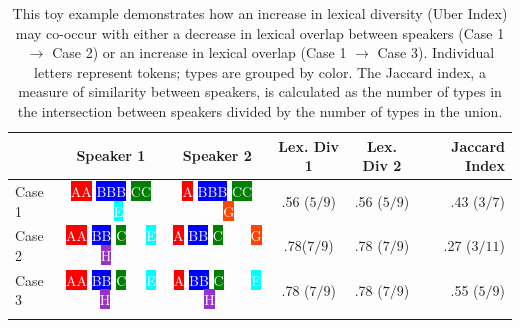 \documentclass[10pt,letterpaper]{article}
\begin{document}
\begin{table}[b]
\centering
\begin{tabular}{ l | c | c | c | c | r }
    & Speaker 1  & Speaker 2 & Lex. Div 1 & Lex. Div 2 & Jaccard Index\\
    \hline
  Case 1 & \colorbox{red}{\textcolor{white}{AA}} \colorbox{blue}{\textcolor{white}{BBB}} \colorbox{green}{\textcolor{white}{CC}} \colorbox{BurntOrange}{\textcolor{white}{D}} \colorbox{cyan}{\textcolor{white}{E}} & \colorbox{red}{\textcolor{white}{A}}  \colorbox{blue}{\textcolor{white}{BBB}} \colorbox{green}{\textcolor{white}{CC}} \colorbox{OliveGreen}{\textcolor{white}{FF}} \colorbox{OrangeRed}{\textcolor{white}{G}} & .56 ($5/9$) & .56 ($5/9$) & .43 ($3/7$)  \\
  Case 2 & \colorbox{red}{\textcolor{white}{AA}} \colorbox{blue}{\textcolor{white}{BB}} \colorbox{green}{\textcolor{white}{C}} \colorbox{BurntOrange}{\textcolor{white}{D}} \colorbox{cyan}{\textcolor{white}{E}} \colorbox{DarkOrchid} {\textcolor{white}{H}} \colorbox{Emerald}{\textcolor{white}{I}} & \colorbox{red}{\textcolor{white}{A}}  \colorbox{blue}{\textcolor{white}{BB}} \colorbox{green}{\textcolor{white}{C}} \colorbox{OliveGreen}{\textcolor{white}{FF}} \colorbox{OrangeRed}{\textcolor{white}{G}} \colorbox{RoyalPurple}{\textcolor{white}{J}} \colorbox{Dandelion}{\textcolor{white}{K}}  & .78($7/9$) & .78 ($7/9$) & .27 ($3/11$)  \\
  Case 3 & \colorbox{red}{\textcolor{white}{AA}} \colorbox{blue}{\textcolor{white}{BB}}  \colorbox{green}{\textcolor{white}{C}}  \colorbox{BurntOrange}{\textcolor{white}{D}} \colorbox{cyan}{\textcolor{white}{E}} \colorbox{DarkOrchid} {\textcolor{white}{H}} \colorbox{RoyalPurple}{\textcolor{white}{J}} &  \colorbox{red}{\textcolor{white}{A}} \colorbox{blue}{\textcolor{white}{BB}} \colorbox{green}{\textcolor{white}{C}} \colorbox{OliveGreen}{\textcolor{white}{FF}}  \colorbox{cyan}{\textcolor{white}{E}} \colorbox{DarkOrchid} {\textcolor{white}{H}} \colorbox{Dandelion}{\textcolor{white}{K}} & .78 ($7/9$) & .78 ($7/9$) & .55 ($5/9$)  \\	  
  \\
\end{tabular}
\caption{This toy example demonstrates how an increase in lexical diversity (Uber Index) may co-occur with either a decrease in lexical overlap between speakers (Case 1$\rightarrow$ Case 2) or an increase in lexical overlap (Case 1 $\rightarrow$ Case 3). Individual letters represent tokens; types are grouped by color. The Jaccard index, a measure of similarity between speakers, is calculated as the number of types in the intersection between speakers divided by the number of types in the union. }
\label{tab:diversityAndOverlap}
\end{table}
\end{document}
